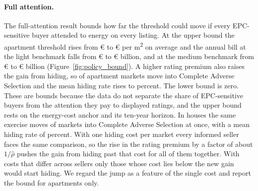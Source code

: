 \paragraph{Full attention.}
The full-attention result bounds how far the threshold could move if every EPC-sensitive buyer attended to energy on every listing. At the upper bound the apartment threshold rises from \euro{}\attScBaseRbarApt{} to \euro{}\attScHiRbarApt{} per m\textsuperscript{2} on average and the annual bill at the light benchmark falls from \euro{}\attScBaseCostTwoFiftyApt{} to \euro{}\attScHiCostTwoFiftyApt{} billion, and at the medium benchmark from \euro{}\attScBaseCostFiveHundredApt{} to \euro{}\attScHiCostFiveHundredApt{} billion (Figure~\ref{fig:policy_bound}). A higher rating premium also raises the gain from hiding, so \attScHiNCasApt{} of \attNMarketsApt{} apartment markets move into Complete Adverse Selection and the mean hiding rate rises to \attScHiSigmaApt{} percent. The lower bound is zero. These are bounds because the data do not separate the share of EPC-sensitive buyers from the attention they pay to displayed ratings, and the upper bound rests on the energy-cost anchor and its ten-year horizon. In houses the same exercise moves \attScHiNCasHouse{} of \attNMarketsHouse{} markets into Complete Adverse Selection at once, with a mean hiding rate of \attScHiSigmaHouse{} percent. With one hiding cost per market every informed seller faces the same comparison, so the rise in the rating premium by a factor of about $1/\hat\rho$ pushes the gain from hiding past that cost for all of them together. With costs that differ across sellers only those whose cost lies below the new gain would start hiding. We regard the jump as a feature of the single cost and report the bound for apartments only.
